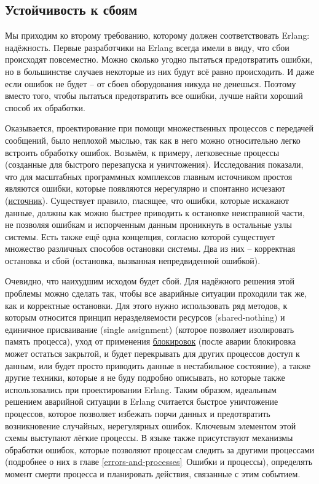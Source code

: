 \subsection{Устойчивость к сбоям}
\label{fault-tolerance}
Мы приходим ко второму требованию, которому должен соответствовать Erlang: надёжность.
Первые разработчики на Erlang всегда имели в виду, что сбои происходят повсеместно.
Можно сколько угодно пытаться предотвратить ошибки, но в большинстве случаев некоторые из них будут всё равно происходить.
И даже если ошибок не будет \--- от сбоев оборудования никуда не денешься.
Поэтому вместо того, чтобы пытаться предотвратить все ошибки, лучше найти хороший способ их обработки.

Оказывается, проектирование при помощи множественных процессов с передачей сообщений, было неплохой мыслью, так как в него можно относительно легко встроить обработку ошибок.
Возьмём, к примеру, легковесные процессы (созданные для быстрого перезапуска и уничтожения).
Исследования показали, что для масштабных программных комплексов главным источником простоя являются ошибки, которые появляются нерегулярно и спонтанно исчезают (\href{http://dslab.epfl.ch/pubs/crashonly/}{источник}).
Существует правило, гласящее, что ошибки, которые искажают данные, должны как можно быстрее приводить к остановке неисправной части, не позволяя ошибкам и испорченным данным проникнуть в остальные узлы системы.
Есть также ещё одна концепция, согласно которой существует множество различных способов остановки системы.
Два из них \--- корректная остановка и сбой (остановка, вызванная непредвиденной ошибкой).

Очевидно, что наихудшим исходом будет сбой.
Для надёжного решения этой проблемы можно сделать так, чтобы все аварийные ситуации проходили так же, как и корректные остановки.
Для этого нужно использовать ряд методов, к которым относится принцип неразделяемости ресурсов (shared-nothing) и единичное присваивание (single assignment) (которое позволяет изолировать память процесса), уход от применения \href{http://en.wikipedia.org/wiki/Lock_(computer_science)}{блокировок} (после аварии блокировка может остаться закрытой, и будет перекрывать для других процессов доступ к данным, или будет просто приводить данные в нестабильное состояние), а также другие техники, которые я не буду подробно описывать, но которые также использовались при проектировании Erlang.
Таким образом, идеальным решением аварийной ситуации в Erlang считается быстрое уничтожение процессов, которое позволяет избежать порчи данных и предотвратить возникновение случайных, нерегулярных ошибок.
Ключевым элементом этой схемы выступают лёгкие процессы.
В языке также присутствуют механизмы обработки ошибок, которые позволяют процессам следить за другими процессами (подробнее о них в главе \ref{errors-and-processes}~Ошибки и процессы), определять момент смерти процесса и планировать действия, связанные с этим событием.

